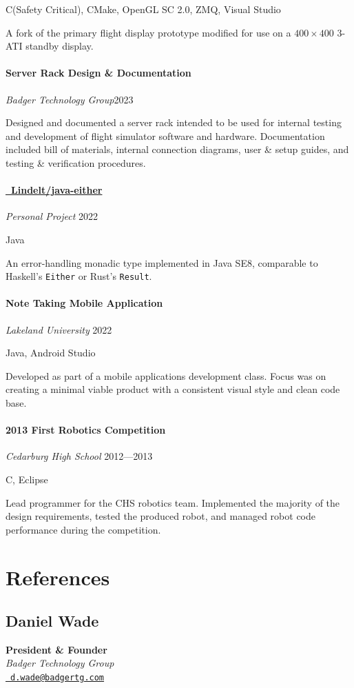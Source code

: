 \documentclass[10pt]{article}
\newcommand{\Rplus}{\protect\raisebox{0.35ex}{\smaller[2]{\textbf{+}}}}
\newcommand{\Cpp}{\mbox{C\Rplus\Rplus}}
\newcommand{\firstpar}{\vspace{4pt}\noindent}
\begin{document}
\noindent
{\small \Cpp (Safety Critical), CMake, OpenGL SC 2.0, ZMQ, Visual Studio}

\firstpar
A fork of the primary flight display prototype modified for use on a $400\!\times\!400$ 3-ATI
standby display.

\paragraph{Server Rack Design \& Documentation}
\vline\quad \textit{Badger Technology Group}\hfill 2023

\firstpar
Designed and documented a server rack intended to be used for internal testing and development
of flight simulator software and hardware. Documentation included bill of materials, internal
connection diagrams, user \& setup guides, and testing \& verification procedures.

\paragraph{\href{https://github.com/Lindelt/java-either}{\faGithub\ Lindelt/java-either}}
\vline\quad \textit{Personal Project} \hfill 2022

\noindent
{\small Java}

\firstpar
An error-handling monadic type implemented in Java SE8, comparable to Haskell's \texttt{Either} or
Rust's \texttt{Result}.

\paragraph{Note Taking Mobile Application}
\vline\quad \textit{Lakeland University} \hfill 2022

\noindent
{\small Java, Android Studio}

\firstpar
Developed as part of a mobile applications development class. Focus was on creating a minimal
viable product with a consistent visual style and clean code base.

\paragraph{2013 First Robotics Competition}
\vline\quad \textit{Cedarburg High School} \hfill 2012---2013

\noindent
{\small \Cpp, Eclipse}

\firstpar
Lead programmer for the CHS robotics team. Implemented the majority of the design
requirements, tested the produced robot, and managed robot code performance during
the competition.

\section*{References}
\subsection*{Daniel Wade}
\textbf{President \& Founder} \\
\textit{Badger Technology Group} \\
\href{mailto:d.wade@badgertg.com}{\faEnvelope\ \texttt{d.wade@badgertg.com}}
\end{document}
